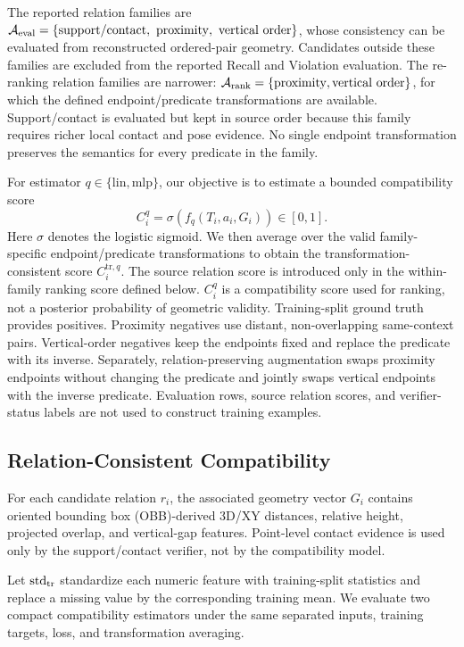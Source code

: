 The reported relation families are 
$\mathcal{A}_{\rm eval}=\{\mathrm{support/contact},\ \mathrm{proximity},\ \mathrm{vertical\ order}\}$, 
whose consistency can be evaluated from reconstructed ordered-pair geometry. Candidates outside these families are excluded from the reported Recall and Violation evaluation. The re-ranking relation families are narrower: $\mathcal A_{\rm rank}=\{\mathrm{proximity},\mathrm{vertical\ order}\}$, for which the defined endpoint/predicate transformations are available. Support/contact is evaluated but kept in source order because this family requires richer local contact and pose evidence. No single endpoint transformation preserves the semantics for every predicate in the family. 

For estimator $q\in\{\mathrm{lin},\mathrm{mlp}\}$, our objective is to estimate a bounded compatibility score
\begin{equation}
C_i^q=\sigma\!\left(f_q(T_i,a_i,G_i)\right)\in[0,1].
\end{equation}
Here $\sigma$ denotes the logistic sigmoid. We then average over the valid family-specific endpoint/predicate transformations to obtain the transformation-consistent score $C_i^{\mathrm{tr},q}$. The source relation score is introduced only in the within-family ranking score defined below. $C_i^q$ is a compatibility score used for ranking, not a posterior probability of geometric validity. Training-split ground truth provides positives. Proximity negatives use distant, non-overlapping same-context pairs. Vertical-order negatives keep the endpoints fixed and replace the predicate with its inverse. Separately, relation-preserving augmentation swaps proximity endpoints without changing the predicate and jointly swaps vertical endpoints with the inverse predicate. Evaluation rows, source relation scores, and verifier-status labels are not used to construct training examples.

\subsection{Relation-Consistent Compatibility}
\label{sec:Compatibility}
For each candidate relation $r_i$, the associated geometry vector $G_i$ contains oriented bounding box (OBB)-derived 3D/XY distances, relative height, projected overlap, and vertical-gap features. Point-level contact evidence is used only by the support/contact verifier, not by the compatibility model. 

Let $\operatorname{std}_{\rm tr}$ standardize each numeric feature with training-split statistics and replace a missing value by the corresponding training mean. We evaluate two compact compatibility estimators under the same separated inputs, training targets, loss, and transformation averaging. 
